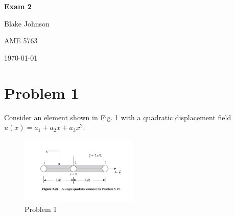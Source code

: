 \documentclass{article}
\newcommand{\coursenumber}{AME 5763}
\begin{document}
\begin{titlepage}
    \centering
    {\LARGE \bfseries Exam 2 \par}
    \vspace{1cm}
    {\Large Blake Johnson \par}
    \vspace{0.5cm}
    {\Large \coursenumber \par}
    \vfill
    {\large \today \par}
\end{titlepage}

\newpage  %

\section*{Problem 1}

Consider an element shown in Fig. 1 with a quadratic displacement field \( u(x) = a_1 + a_2 x + a_3 x^2 \).

\begin{figure}[h!]
    \centering
    \includegraphics[width=0.5\textwidth]{figure_1.png}  %
    \caption{Problem 1}
    \label{fig:element}
\end{figure}
\end{document}
